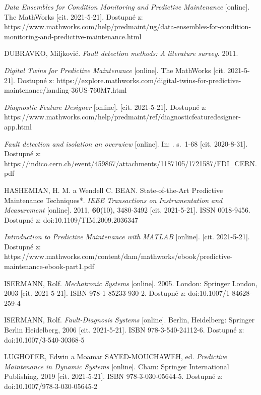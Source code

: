 \begin{thebibliography}{14}


 \textit{Data Ensembles for Condition Monitoring and
Predictive Maintenance} [online]. The MathWorks [cit. 2021-5-21]. Dostupné
z:
https://www.mathworks.com/help/predmaint/ug/data-ensembles-for-condition-monitoring-and-predictive-maintenance.html
    
 DUBRAVKO, Miljković. \textit{Fault detection methods:
A literature survey}. 2011.


 \textit{Digital Twins for Predictive Maintenance}
[online]. The MathWorks [cit. 2021-5-21]. Dostupné z:
https://explore.mathworks.com/digital-twins-for-predictive-maintenance/landing-36US-760M7.html


 \textit{Diagnostic Feature Designer} [online]. [cit.
2021-5-21]. Dostupné z:
https://www.mathworks.com/help/predmaint/ref/diagnosticfeaturedesigner-app.html



 \textit{Fault detection and isolation an overwiew}
[online]. In: . s.~1-68 [cit. 2020-8-31]. Dostupné z:
https://indico.cern.ch/event/459867/attachments/1187105/1721587/FDI\_CERN.pdf


 HASHEMIAN, H. M. a Wendell C. BEAN.
State-of-the-Art Predictive Maintenance Techniques*. \textit{IEEE
Transactions on Instrumentation and Measurement} [online]. 2011,
\textbf{60}(10), 3480-3492 [cit. 2021-5-21]. ISSN 0018-9456. Dostupné z:
doi:10.1109/TIM.2009.2036347


 \textit{Introduction to Predictive Maintenance with
MATLAB} [online]. [cit. 2021-5-21]. Dostupné z:
https://www.mathworks.com/content/dam/mathworks/ebook/predictive-maintenance-ebook-part1.pdf


 ISERMANN, Rolf. \textit{Mechatronic Systems}
[online]. 2005. London: Springer London, 2003 [cit. 2021-5-21]. ISBN
978-1-85233-930-2. Dostupné z: doi:10.1007/1-84628-259-4


 ISERMANN, Rolf. \textit{Fault-Diagnosis Systems}
[online]. Berlin, Heidelberg: Springer Berlin Heidelberg, 2006 [cit.
2021-5-21]. ISBN 978-3-540-24112-6. Dostupné z: doi:10.1007/3-540-30368-5


 LUGHOFER, Edwin a Moamar SAYED-MOUCHAWEH, ed.
\textit{Predictive Maintenance in Dynamic Systems} [online]. Cham: Springer
International Publishing, 2019 [cit. 2021-5-21]. ISBN 978-3-030-05644-5.
Dostupné z: doi:10.1007/978-3-030-05645-2



\end{thebibliography}

